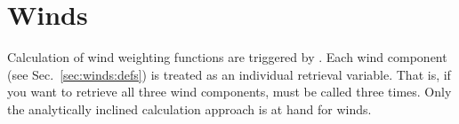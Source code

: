 


\section{Winds}
\label{sec:wfuns:winds}
%
Calculation of wind weighting functions are triggered by
. Each wind component (see Sec.~\ref{sec:winds:defs})
is treated as an individual retrieval variable. That is, if you want to
retrieve all three wind components,  must be called
three times. Only the analytically inclined calculation approach is at hand
for winds.

